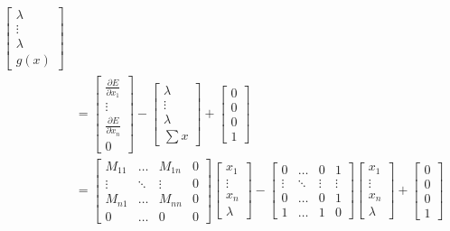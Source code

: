 \documentclass{article}
\begin{document}
\begin{align*}
\begin{bmatrix}
	\lambda \\
	\vdots \\
	\lambda \\
	g(x)
\end{bmatrix} \\
&=
\begin{bmatrix}
	\frac{\partial E}{\partial x_1} \\
	\vdots \\
	\frac{\partial E}{\partial x_n} \\
	0
\end{bmatrix} - 
\begin{bmatrix}
	\lambda \\
	\vdots \\
	\lambda \\
	\sum x
\end{bmatrix} + 
\begin{bmatrix}
	0 \\
	0 \\
	0 \\
	1
\end{bmatrix}\\
&=
\begin{bmatrix}
	M_{11} & \dots  & M_{1n} & 0 \\
	\vdots & \ddots & \vdots & 0 \\
	M_{n1} & \dots  & M_{nn} & 0 \\
	0      & \dots  & 0		 & 0
\end{bmatrix}
\begin{bmatrix}
	x_1 \\ \vdots \\ x_n \\ \lambda
\end{bmatrix} - 
\begin{bmatrix}
	0 	   & \dots  & 0 	 & 1 \\
	\vdots & \ddots & \vdots & \vdots \\
	0	   & \dots  & 0 	 & 1 \\
	1      & \dots  & 1		 & 0
\end{bmatrix}
\begin{bmatrix}
	x_1 \\
	\vdots \\
	x_n\\
	\lambda
\end{bmatrix} +
\begin{bmatrix}
	0 \\
	0 \\
	0 \\
	1
\end{bmatrix} \\

\end{align*}
\end{document}
